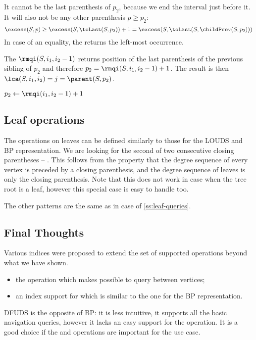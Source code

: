 It cannot be the last parenthesis of $p_2$, because we end the interval just before it.
It will also not be any other parenthesis $p \ge p_2$:
$$\excess(S, p) \ge \excess(S, \toLast(S, p_2)) + 1 = \excess(S, \toLast(S, \childPrev(S, p_2)))$$
In case of an equality, the \rmqi returns the left-most occurrence.

The $\rmqi(S, i_1, i_2 - 1)$ returns position of the last parenthesis of the previous sibling of $p_2$ and therefore $p_2 = \rmqi(S, i_1, i_2 - 1) + 1$.
The result is then $\lca(S, i_1, i_2) = j = \parent(S, p_2)$.

\begin{algorithm}
\begin{algorithmic}
		\State {}
		\State {}
	\Else
		\State $p_2 \gets \rmqi(i_1, i_2 - 1) + 1$
		\State {}
	\EndIf
\EndFunction
\end{algorithmic}
\end{algorithm}

\subsection{Leaf operations}

The operations on leaves can be defined similarly to those for the LOUDS and BP representation.
We are looking for the second of two consecutive closing parentheses -- \str{))}.
This follows from the property that the degree sequence of every vertex is preceded by a closing parenthesis, and the degree sequence of leaves is only the closing parenthesis.
Note that this does not work in case when the tree root is a leaf, however this special case is easy to handle too.

The other patterns are the same as in case of \ref{ss:leaf-queries}.

\subsection{Final Thoughts}

Various indices were proposed to extend the set of supported operations beyond what we have shown.
\begin{itemize}
	\item the operation \dep{} which makes possible to query \distance{} between vertices;
	\item an index support for \levelAncestor{} which is similar to the one for the BP representation.
\end{itemize}

DFUDS is the opposite of BP: it is less intuitive, it supports all the basic navigation queries, however it lacks an easy support for the \dep{} operation.
It is a good choice if the \preRank{} and \childAny{} operations are important for the use case.